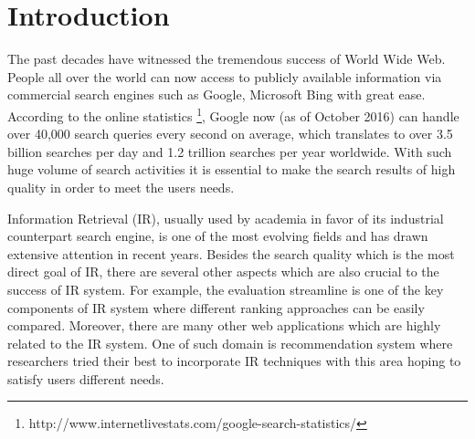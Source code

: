 %
%
\chapter{Introduction}
The past decades have witnessed the tremendous success of World Wide Web. 
People all over the world can now access to publicly available 
information via commercial search engines such as Google, Microsoft Bing 
with great ease. According to the online statistics \footnote{http://www.internetlivestats.com/google-search-statistics/}, 
Google now (as of October 2016) can handle over 40,000 search queries 
every second on average, which translates to over 3.5 billion searches 
per day and 1.2 trillion searches per year worldwide. 
With such huge volume of search activities it is essential to make the 
search results of high quality in order to meet the users needs.

Information Retrieval (IR), usually used by academia in favor of its 
industrial counterpart search engine, 
is one of the most evolving fields and has drawn extensive attention in 
recent years. 
Besides the search quality which is the most direct goal of IR, there 
are several other aspects which are also crucial to the success of IR 
system. For example, the evaluation streamline is one of the key 
components of IR system where different ranking approaches can be 
easily compared. Moreover, there are many other web applications which 
are highly related to the IR system. One of such domain is recommendation 
system where researchers tried their best to incorporate IR techniques 
with this area hoping to satisfy users different needs.


